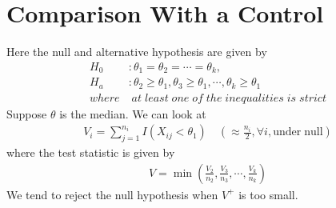 \documentclass[twoside]{article}
\begin{document}
	\section{Comparison With a Control}
	Here the null and alternative hypothesis are given by
	\begin{align*}
		H_0 &: \theta_1 = \theta_2 = \cdots = \theta_k, \\
		H_a &: \theta_2 \geqslant \theta_1, \theta_3 \geqslant \theta_1, \cdots, \theta_k \geqslant \theta_1 \\
		where &\; at \; least \; one \; of \; the \; inequalities \; is \; strict
	\end{align*}
	Suppose $\theta$ is the median. We can look at
	\begin{align*}
		V_i = \sum_{j=1}^{n_i} I \left( X_{ij} < \theta_1 \right) \quad (\approx \frac{n_i}{2}, \forall i, \mathrm{under \; null})
	\end{align*}
	where the test statistic is given by
	\begin{align*}
		V = \min \left( \frac{V_2}{n_2}, \frac{V_3}{n_3}, \cdots, \frac{V_k}{n_k} \right)
	\end{align*}
	We tend to reject the null hypothesis when $V^+$ is too small. 
	
\end{document}
